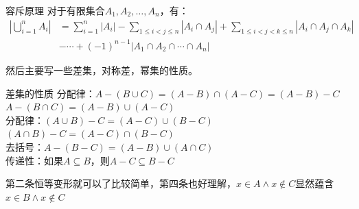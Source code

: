 \begin{theorem}{容斥原理}{}
对于有限集合$A_1, A_2, \ldots, A_n$，有：
\begin{align*}
\left|\bigcup_{i=1}^n A_i\right| &= \sum_{i=1}^n |A_i| 
                               - \sum_{1 \leq i < j \leq n} |A_i \cap A_j| + \sum_{1 \leq i < j < k \leq n} |A_i \cap A_j \cap A_k| \\
                               &- \cdots + (-1)^{n-1} |A_1 \cap A_2 \cap \cdots \cap A_n|
\end{align*}
\end{theorem}
然后主要写一些差集，对称差，幂集的性质。
\begin{theorem}{差集的性质}{}
分配律：$A - (B \cup C) = (A - B) \cap (A - C)=(A - B) - C$\quad$A - (B \cap C) = (A - B) \cup (A - C)$\\
分配律：$(A \cup B) - C = (A - C) \cup (B - C)$\quad$(A \cap B) - C = (A - C) \cap (B - C)$\\
去括号：$A - (B - C) = (A - B) \cup (A \cap C)$\\
传递性：如果$A \subseteq B$，则$A - C \subseteq B - C$
\end{theorem}
第二条恒等变形就可以了比较简单，第四条也好理解，$x\in A\land x\notin C$显然蕴含$x\in B\land x\notin C$

